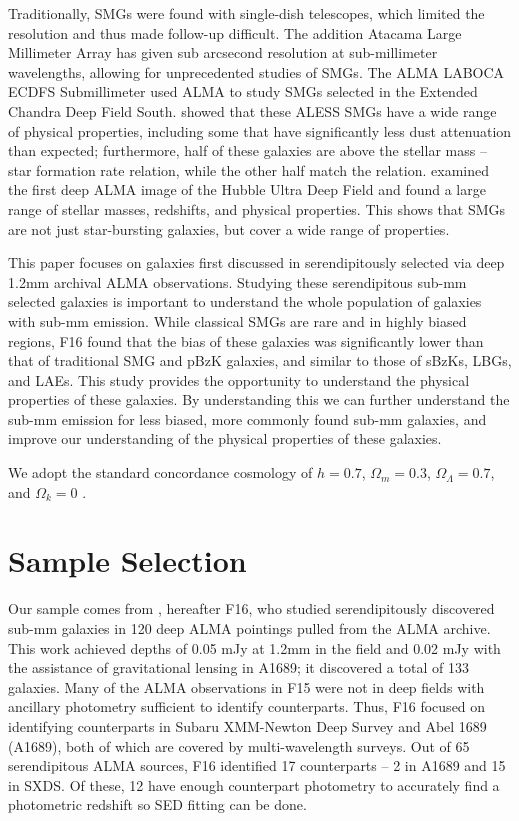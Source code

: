 \documentclass[preprint,natbib209]{aastex}
\begin{document}
Traditionally, SMGs were found with single-dish telescopes, which limited the resolution and thus made follow-up difficult. The addition Atacama Large Millimeter Array has given sub arcsecond resolution at sub-millimeter wavelengths, allowing for unprecedented studies of SMGs. The ALMA LABOCA ECDFS Submillimeter \citep[ALESS;][]{hodge13} used ALMA to study SMGs selected in the Extended Chandra Deep Field South. \cite{dacunha15} showed that these ALESS SMGs have a wide range of physical properties, including some that have significantly less dust attenuation than expected; furthermore, half of these galaxies are above the stellar mass -- star formation rate relation, while the other half match the relation. \cite{dunlop16} examined the first deep ALMA image of the Hubble Ultra Deep Field and found a large range of stellar masses, redshifts, and physical properties. This shows that SMGs are not just star-bursting galaxies, but cover a wide range of properties. 

This paper focuses on galaxies first discussed in \cite{fujimoto16} serendipitously selected via deep 1.2mm archival ALMA observations. 
Studying these serendipitous sub-mm selected galaxies is important to understand the whole population of galaxies with sub-mm emission.
While classical SMGs are rare and in highly biased regions, F16 found that the bias of these galaxies was significantly lower than that of traditional SMG and pBzK galaxies, and similar to those of sBzKs, LBGs, and LAEs. This study provides the opportunity to understand the physical properties of these galaxies. By understanding this we can further understand the sub-mm emission for less biased, more commonly found sub-mm galaxies, and improve our understanding of the physical properties of these galaxies.

We adopt the standard concordance cosmology of $h = 0.7$, $\Omega_m = 0.3$, $\Omega_\Lambda = 0.7$, 
and $\Omega_k = 0$ \citep{planck13}.

\section{Sample Selection} 
\label{sec:sample}

Our sample comes from \citet{fujimoto16}, hereafter F16, who studied serendipitously discovered sub-mm galaxies in 
120 deep ALMA pointings pulled from the ALMA archive. This work achieved depths of 0.05 mJy at 1.2mm in the field and 0.02 mJy 
with the assistance of gravitational lensing in A1689; it discovered a total of 133 galaxies. Many of the ALMA observations in F15 were not
in deep fields with ancillary photometry sufficient to identify counterparts. Thus, F16 focused on identifying counterparts in Subaru XMM-Newton Deep 
Survey \citep[SXDS;][]{furusawa08} and Abel 1689 (A1689), both of which are covered by multi-wavelength surveys. 
Out of 65 serendipitous ALMA sources, F16 identified 17 counterparts -- 2 in A1689 and 15 in SXDS. Of these, 12 have enough counterpart photometry to accurately find a photometric redshift so SED fitting can be done.
\end{document}
